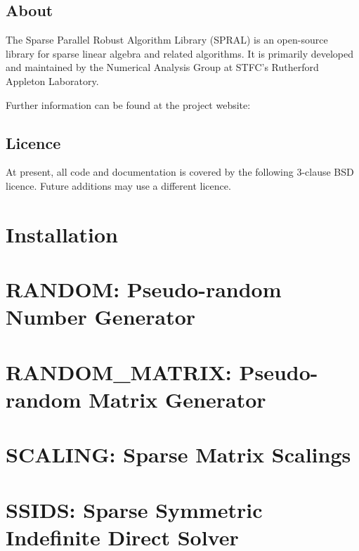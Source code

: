 \documentclass{spralweb}
\begin{document}
\tableofcontents

\let\oldthesection\thesection
\renewcommand{\thesection}{}
\section{About}
The Sparse Parallel Robust Algorithm Library (SPRAL) is an open-source library
for sparse linear algebra and related algorithms. It is primarily developed and
maintained by the Numerical Analysis Group at STFC's Rutherford Appleton Laboratory.

\noindent
Further information can be found at the project website:

\section{Licence}
At present, all code and documentation is covered by the following 3-clause BSD
licence. Future additions may use a different licence.



\renewcommand{\thesection}{\oldthesection}

\chapter{Installation}

\chapter{RANDOM: Pseudo-random Number Generator}

\chapter{RANDOM\_MATRIX: Pseudo-random Matrix Generator}

\chapter{SCALING: Sparse Matrix Scalings}

\chapter{SSIDS: Sparse Symmetric Indefinite Direct Solver}

\end{document}

